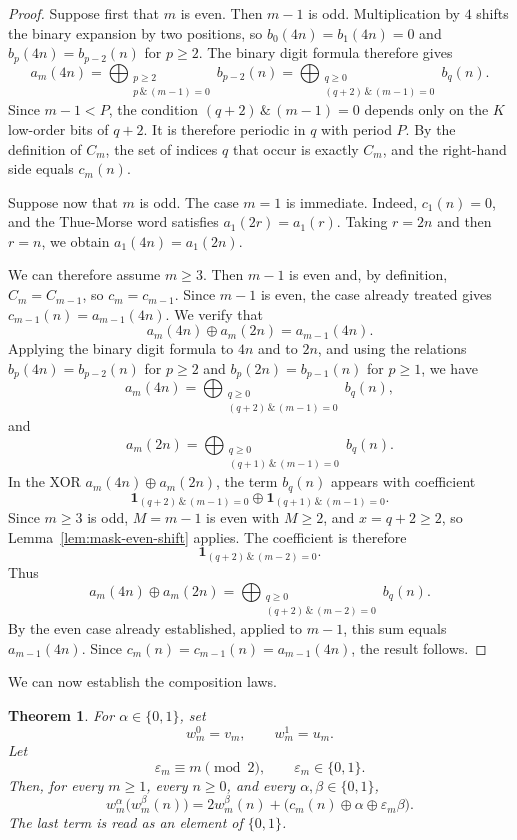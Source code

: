 \documentclass[12pt,reqno]{article}
\theoremstyle{plain}
\newtheorem{theorem}{Theorem}[section]
\theoremstyle{definition}
\begin{document}
\begin{proof}
Suppose first that $m$ is even. Then $m-1$ is odd. Multiplication by $4$ shifts the binary expansion by two positions, so $b_0(4n) = b_1(4n) = 0$ and $b_p(4n) = b_{p-2}(n)$ for $p \ge 2$. The binary digit formula therefore gives
\[
  a_m(4n) = \bigoplus_{\substack{p \ge 2 \\ p \,\&\, (m-1) = 0}} b_{p-2}(n) = \bigoplus_{\substack{q \ge 0 \\ (q+2) \,\&\, (m-1) = 0}} b_q(n).
\]
Since $m-1 < P$, the condition $(q+2) \,\&\, (m-1) = 0$ depends only on the $K$ low-order bits of $q+2$. It is therefore periodic in $q$ with period $P$. By the definition of $C_m$, the set of indices $q$ that occur is exactly $C_m$, and the right-hand side equals $c_m(n)$.

Suppose now that $m$ is odd. The case $m = 1$ is immediate. Indeed, $c_1(n) = 0$, and the Thue-Morse word satisfies $a_1(2r) = a_1(r)$. Taking $r = 2n$ and then $r = n$, we obtain $a_1(4n) = a_1(2n)$.

We can therefore assume $m \ge 3$. Then $m-1$ is even and, by definition, $C_m = C_{m-1}$, so $c_m = c_{m-1}$. Since $m-1$ is even, the case already treated gives $c_{m-1}(n) = a_{m-1}(4n)$. We verify that
\[
  a_m(4n) \oplus a_m(2n) = a_{m-1}(4n).
\]
Applying the binary digit formula to $4n$ and to $2n$, and using the relations $b_p(4n) = b_{p-2}(n)$ for $p \ge 2$ and $b_p(2n) = b_{p-1}(n)$ for $p \ge 1$, we have
\[
  a_m(4n) = \bigoplus_{\substack{q \ge 0 \\ (q+2) \,\&\, (m-1) = 0}} b_q(n),
\]
and
\[
  a_m(2n) = \bigoplus_{\substack{q \ge 0 \\ (q+1) \,\&\, (m-1) = 0}} b_q(n).
\]
In the XOR $a_m(4n) \oplus a_m(2n)$, the term $b_q(n)$ appears with coefficient
\[
  \mathbf{1}_{(q+2) \,\&\, (m-1) = 0} \oplus \mathbf{1}_{(q+1) \,\&\, (m-1) = 0}.
\]
Since $m \ge 3$ is odd, $M = m-1$ is even with $M \ge 2$, and $x = q+2 \ge 2$, so Lemma~\ref{lem:mask-even-shift} applies. The coefficient is therefore
\[
  \mathbf{1}_{(q+2) \,\&\, (m-2) = 0}.
\]
Thus
\[
  a_m(4n) \oplus a_m(2n) = \bigoplus_{\substack{q \ge 0 \\ (q+2) \,\&\, (m-2) = 0}} b_q(n).
\]
By the even case already established, applied to $m-1$, this sum equals $a_{m-1}(4n)$. Since $c_m(n) = c_{m-1}(n) = a_{m-1}(4n)$, the result follows.
\end{proof}

We can now establish the composition laws.

\begin{theorem}
\label{thm:compositions-evil-odious}
For \(\alpha\in\{0,1\}\), set
\[
  w_m^0=v_m,\qquad w_m^1=u_m.
\]
Let
\[
  \varepsilon_m \equiv m \pmod 2,\qquad \varepsilon_m\in\{0,1\}.
\]
Then, for every \(m\ge1\), every \(n\ge0\), and every
\(\alpha,\beta\in\{0,1\}\),
\[
  w_m^\alpha\bigl(w_m^\beta(n)\bigr)
  =
  2w_m^\beta(n)
  +
  \bigl(c_m(n)\oplus \alpha\oplus \varepsilon_m\beta\bigr).
\]
The last term is read as an element of \(\{0,1\}\).
\end{theorem}
\end{document}
